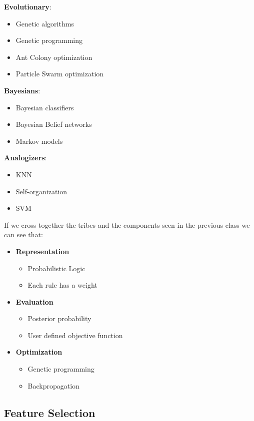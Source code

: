 \textbf{Evolutionary}:
\begin{itemize}
    \item Genetic algorithms
    \item Genetic programming
    \item Ant Colony optimization
    \item Particle Swarm optimization
\end{itemize}

\textbf{Bayesians}:
\begin{itemize}
    \item Bayesian classifiers
    \item Bayesian Belief networks
    \item Markov models
\end{itemize}

\textbf{Analogizers}:
\begin{itemize}
    \item KNN
    \item Self-organization
    \item SVM
\end{itemize}

If we cross together the tribes and the components seen in the previous class we can see that:

\begin{itemize}
    \item \textbf{Representation}
    \begin{itemize}
        \item Probabilistic Logic
        \item Each rule has a weight
    \end{itemize}
    \item \textbf{Evaluation}
    \begin{itemize}
        \item Posterior probability
        \item User defined objective function
    \end{itemize}
    \item \textbf{Optimization}
    \begin{itemize}
        \item Genetic programming
        \item Backpropagation
    \end{itemize}
\end{itemize}


\subsection{Feature Selection}

